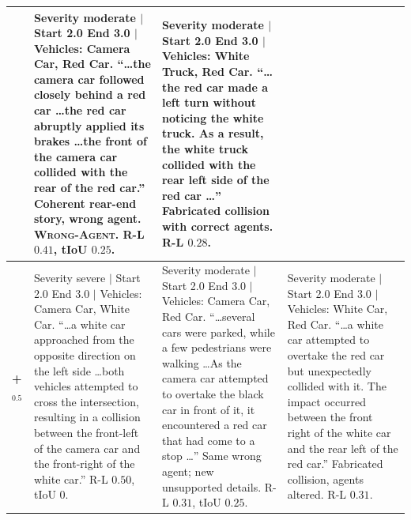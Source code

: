 \begin{table}[!t]
\begin{tabular}{@{}p{1.35cm}p{5.05cm}p{5.05cm}p{5.05cm}@{}}
&
Severity moderate $|$ Start 2.0 End 3.0 $|$ Vehicles: Camera Car, \textcolor{red!70!black}{Red Car}. ``\ldots the camera car followed closely behind a \textcolor{red!70!black}{red car} \ldots the red car abruptly applied its brakes \ldots the front of the camera car collided with the rear of the red car.'' Coherent rear-end story, wrong agent. \textsc{Wrong-Agent}. R-L $0.41$, tIoU $0.25$.
&
Severity \textcolor{red!70!black}{moderate} $|$ Start \textcolor{red!70!black}{2.0} End \textcolor{red!70!black}{3.0} $|$ Vehicles: White Truck, Red Car. ``\ldots the red car made a left turn without noticing the white truck. \textcolor{red!70!black}{As a result, the white truck collided with the rear left side of the red car} \ldots'' Fabricated collision with correct agents. R-L $0.28$.
\\
\midrule
\textbf{\crashlogic{} + \tcd{}$_{0.5}$} &
Severity \textcolor{red!70!black}{severe} $|$ Start \textcolor{red!70!black}{2.0} End \textcolor{red!70!black}{3.0} $|$ Vehicles: Camera Car, White Car. ``\ldots a white car approached from the opposite direction on the left side \ldots both vehicles attempted to cross the intersection, resulting in a collision between the front-left of the camera car and the front-right of the white car.'' R-L $0.50$, tIoU $0$.
&
Severity moderate $|$ Start 2.0 End 3.0 $|$ Vehicles: Camera Car, \textcolor{red!70!black}{Red Car}. ``\ldots several cars were parked, while a few pedestrians were walking \ldots As the camera car attempted to overtake the black car in front of it, it encountered a \textcolor{red!70!black}{red car} that had come to a stop \ldots'' Same wrong agent; new unsupported details. R-L $0.31$, tIoU $0.25$.
&
Severity \textcolor{red!70!black}{moderate} $|$ Start \textcolor{red!70!black}{2.0} End \textcolor{red!70!black}{3.0} $|$ Vehicles: \textcolor{red!70!black}{White Car}, Red Car. ``\ldots \textcolor{red!70!black}{a white car attempted to overtake the red car but unexpectedly collided with it}. The impact occurred between the front right of the white car and the rear left of the red car.'' Fabricated collision, agents altered. R-L $0.31$.
\\
\bottomrule
\end{tabular}
\end{table}
